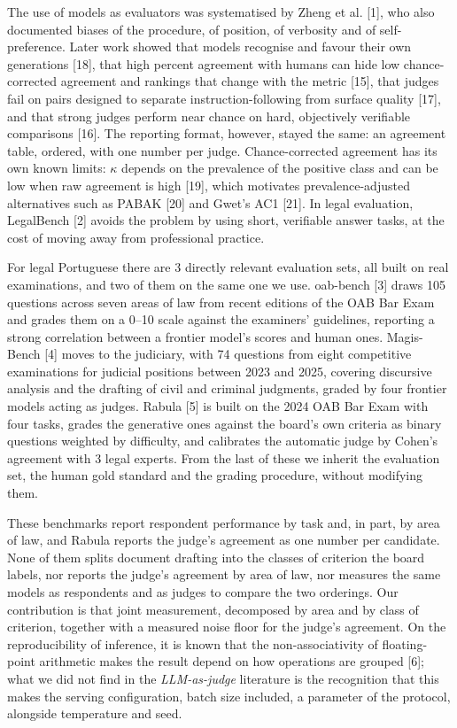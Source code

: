 \documentclass{IOS-Book-Article}
\begin{document}
The use of models as evaluators was systematised by Zheng et al. [1], who also documented biases of the procedure, of position, of verbosity and of self-preference. Later work showed that models recognise and favour their own generations [18], that high percent agreement with humans can hide low chance-corrected agreement and rankings that change with the metric [15], that judges fail on pairs designed to separate instruction-following from surface quality [17], and that strong judges perform near chance on hard, objectively verifiable comparisons [16]. The reporting format, however, stayed the same: an agreement table, ordered, with one number per judge. Chance-corrected agreement has its own known limits: $\kappa$ depends on the prevalence of the positive class and can be low when raw agreement is high [19], which motivates prevalence-adjusted alternatives such as PABAK [20] and Gwet's AC1 [21]. In legal evaluation, LegalBench [2] avoids the problem by using short, verifiable answer tasks, at the cost of moving away from professional practice.

For legal Portuguese there are 3 directly relevant evaluation sets, all built on real examinations, and two of them on the same one we use. oab-bench [3] draws 105 questions across seven areas of law from recent editions of the OAB Bar Exam and grades them on a 0--10 scale against the examiners' guidelines, reporting a strong correlation between a frontier model's scores and human ones. Magis-Bench [4] moves to the judiciary, with 74 questions from eight competitive examinations for judicial positions between 2023 and 2025, covering discursive analysis and the drafting of civil and criminal judgments, graded by four frontier models acting as judges. Rabula [5] is built on the 2024 OAB Bar Exam with four tasks, grades the generative ones against the board's own criteria as binary questions weighted by difficulty, and calibrates the automatic judge by Cohen's agreement with 3 legal experts. From the last of these we inherit the evaluation set, the human gold standard and the grading procedure, without modifying them.

These benchmarks report respondent performance by task and, in part, by area of law, and Rabula reports the judge's agreement as one number per candidate. None of them splits document drafting into the classes of criterion the board labels, nor reports the judge's agreement by area of law, nor measures the same models as respondents and as judges to compare the two orderings. Our contribution is that joint measurement, decomposed by area and by class of criterion, together with a measured noise floor for the judge's agreement. On the reproducibility of inference, it is known that the non-associativity of floating-point arithmetic makes the result depend on how operations are grouped [6]; what we did not find in the \emph{LLM-as-judge} literature is the recognition that this makes the serving configuration, batch size included, a parameter of the protocol, alongside temperature and seed.
\end{document}
